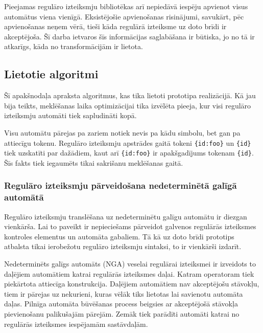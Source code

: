 Pieejamas regulāro izteiksmju bibliotēkas arī nepiedāvā iespēju apvienot visus automātus viena vienīgā. Eksistējošie apvienošanas risinājumi, savukārt, pēc apvienošanas neņem vērā, tieši kāda regulārā izteiksme uz doto brīdi ir akceptējoša. Šī darba ietvaros šīs informācijas saglabāšana ir būtiska, jo no tā ir atkarīgs, kāda no transformācijām ir lietota. 


\subsection{\label{sbs:sol_algorithms}Lietotie algoritmi}

Šī apakšnodaļa apraksta algoritmus, kas tika lietoti prototipa realizācijā. Kā jau bija teikts, meklēšanas laika optimizācijai tika izvēlēta pieeja, kur visi regulāro izteiksmju automāti tiek sapludināti kopā.

Visu automātu pārejas pa zariem notiek nevis pa kādu simbolu, bet gan pa attiecīgu tokenu. Regulāro izteiksmju apstrādes gaitā tokeni \verb|{id:foo}| un \verb|{id}| tiek uzskatīti par dažādiem, kaut arī \verb|{id:foo}| ir apakšgadījums tokenam \verb|{id}|. Šīs fakts tiek iegaumēts tikai sakrišanu meklēšanas gaitā.

\subsubsection{Regulāro izteiksmju pārveidošana nedeterminētā galīgā automātā}


Regulāro izteiksmju translēšana uz nedeterminētu galīgu automātu ir diezgan vienkārša. Lai to paveikt ir nepieciešams  pārveidot galvenos regulārās izteiksmes kontroles elementus un automāta gabaliem. Tā kā uz doto brīdi prototips atbalsta tikai ierobežotu regulāro izteiksmju sintaksi, to ir vienkārši izdarīt.

Nedeterminēts galīgs automāts (NGA) veselai regulārai izteiksmei ir izveidots to daļējiem automātiem katrai regulārās izteiksmes daļai. Katram operatoram tiek piekārtota attiecīga konstrukcija. Daļējiem automātiem nav akceptējošu stāvokļu, tiem ir pārejas uz nekurieni, kuras vēlāk tiks lietotas lai savienotu automāta daļas. Pilnīga automāta būvēšanas process beigsies ar akceptējošā stāvokļa pievienošanu palikušajām pārejām. Zemāk tiek parādīti automāti katrai no regulārās izteiksmes iespējamām sastāvdaļām.

